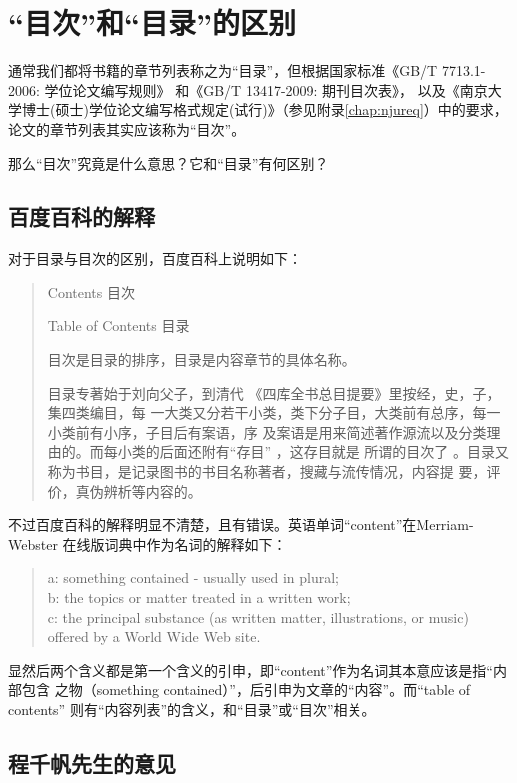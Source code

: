 \chapter{“目次”和“目录”的区别}

通常我们都将书籍的章节列表称之为“目录”，但根据国家标准《GB/T 7713.1-2006: 学位论文编写规则》
\cite{gbt7713.1-2006}和《GB/T 13417-2009: 期刊目次表》\cite{gbt13417-2009}，
以及《南京大学博士(硕士)学位论文编写格式规定(试行)》（参见附录\ref{chap:njureq}）中的要求，
论文的章节列表其实应该称为“目次”。

那么“目次”究竟是什么意思？它和“目录”有何区别？

\section{百度百科的解释}

对于目录与目次的区别，百度百科上说明如下\cite{baidu2013muci}：

\begin{quotation}
Contents 目次

Table of Contents 目录

目次是目录的排序，目录是内容章节的具体名称。

目录专著始于刘向父子，到清代 《四库全书总目提要》里按经，史，子，集四类编目，每
一大类又分若干小类，类下分子目，大类前有总序，每一小类前有小序，子目后有案语，序
及案语是用来简述著作源流以及分类理由的。而每小类的后面还附有“存目” ，这存目就是
所谓的目次了 。目录又称为书目，是记录图书的书目名称著者，搜藏与流传情况，内容提
要，评价，真伪辨析等内容的。
\end{quotation}

不过百度百科的解释明显不清楚，且有错误。英语单词``content''在Merriam-Webster
在线版词典中作为名词的解释如下：
\begin{quotation}
a: something contained - usually used in plural;\\
b: the topics or matter treated in a written work;\\
c: the principal substance (as written matter, illustrations, 
or music) offered by a World Wide Web site.
\end{quotation}

显然后两个含义都是第一个含义的引申，即``content''作为名词其本意应该是指“内部包含
之物（something contained）”，后引申为文章的“内容”。而``table of contents''
则有“内容列表”的含义，和“目录”或“目次”相关。

\section{程千帆先生的意见}

